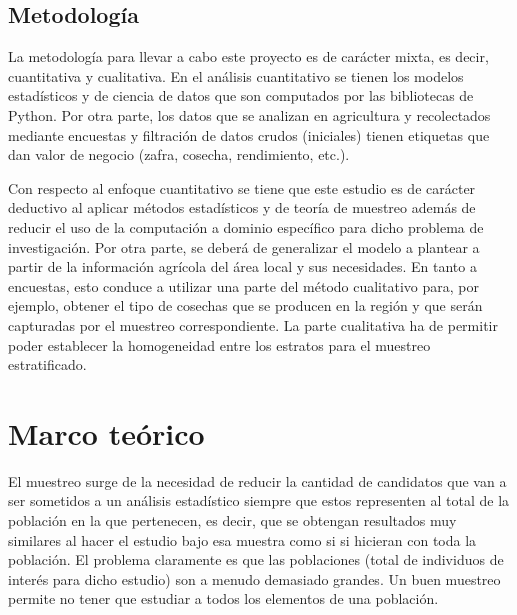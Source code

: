 \documentclass{report}
\begin{document}
\section{Metodología}

La metodología para llevar a cabo este proyecto es de carácter mixta, es decir, cuantitativa y cualitativa. En el análisis cuantitativo se tienen los modelos estadísticos y de ciencia de datos que son computados por las bibliotecas de Python. Por otra parte, los datos que se analizan en agricultura y recolectados mediante encuestas y filtración de datos crudos (iniciales) tienen etiquetas que dan valor de negocio (zafra, cosecha, rendimiento, etc.).

\bigbreak

Con respecto al enfoque cuantitativo se tiene que este estudio es de carácter deductivo al aplicar métodos estadísticos y de teoría de muestreo además de reducir el uso de la computación a dominio específico para dicho problema de investigación. Por otra parte, se deberá de generalizar el modelo a plantear a partir de la información agrícola del área local y sus necesidades. En tanto a encuestas, esto conduce a utilizar una parte del método cualitativo para, por ejemplo, obtener el tipo de cosechas que se producen en la región y que serán capturadas por el muestreo correspondiente. La parte cualitativa ha de permitir poder establecer la homogeneidad entre los estratos para el muestreo estratificado.






\chapter{Marco teórico}

El muestreo surge de la necesidad de reducir la cantidad de candidatos que van a ser sometidos a un análisis estadístico siempre que estos representen al total de la población en la que pertenecen, es decir, que se obtengan resultados muy similares al hacer el estudio bajo esa muestra como si si hicieran con toda la población. El problema claramente es que las poblaciones (total de individuos de interés para dicho estudio) son a menudo demasiado grandes. Un buen muestreo permite no tener que estudiar a todos los elementos de una población. 

\bigbreak
\end{document}
